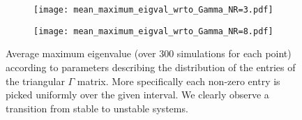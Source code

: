 \documentclass[12pt]{article}
\begin{document}
\begin{appendices}
\begin{figure}
\begin{subfigure}{0.49\textwidth}
				\texttt{[image: mean\_maximum\_eigval\_wrto\_Gamma\_NR=3.pdf]}
			\end{subfigure}
			\hfill
			\begin{subfigure}{0.49\textwidth}
				\texttt{[image: mean\_maximum\_eigval\_wrto\_Gamma\_NR=8.pdf]}
			\end{subfigure}
			\caption{Average maximum eigenvalue (over 300 simulations for each point) according to parameters describing the distribution of the entries of the triangular $\Gamma$ matrix. More specifically each non-zero entry is picked uniformly over the given interval. We clearly observe a transition from stable to unstable systems.} \label{fig : mean max eigenvalue}
		\end{figure}
	
	\end{appendices}		
		
		
		
			
	
	
	\clearpage
	\printbibliography
\end{document}
